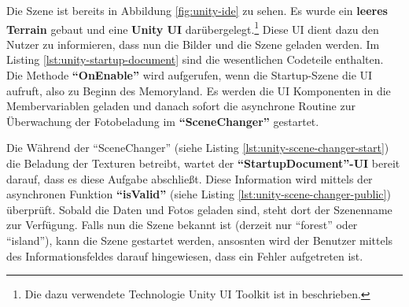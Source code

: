 Die Szene ist bereits in Abbildung \ref{fig:unity-ide} zu sehen. Es wurde ein \textbf{leeres Terrain} gebaut und eine \textbf{Unity UI} darübergelegt.\footnote{Die dazu verwendete Technologie Unity UI Toolkit ist in \cite{UnityDocsUIToolkit} beschrieben.} Diese UI dient dazu den Nutzer zu informieren, dass nun die Bilder und die Szene geladen werden. Im Listing \ref{lst:unity-startup-document} sind die wesentlichen Codeteile enthalten. Die Methode \textbf{``OnEnable''} wird aufgerufen, wenn die Startup-Szene die UI aufruft, also zu Beginn des Memoryland. Es werden die UI Komponenten in die Membervariablen geladen und danach sofort die asynchrone Routine zur Überwachung der Fotobeladung im \textbf{``SceneChanger''} gestartet. 


Die Während der ``SceneChanger'' (siehe Listing \ref{lst:unity-scene-changer-start}) die Beladung der Texturen betreibt, wartet der \textbf{``StartupDocument''-UI} bereit darauf, dass es diese Aufgabe abschlie\ss{}t. Diese Information wird mittels der asynchronen Funktion \textbf{``isValid''} (siehe Listing \ref{lst:unity-scene-changer-public}) überprüft. Sobald die Daten und Fotos geladen sind, steht dort der Szenenname zur Verfügung. Falls nun die Szene bekannt ist (derzeit nur ``forest'' oder ``island''), kann die Szene gestartet werden, ansosnten wird der Benutzer mittels des Informationsfeldes darauf hingewiesen, dass ein Fehler aufgetreten ist.



